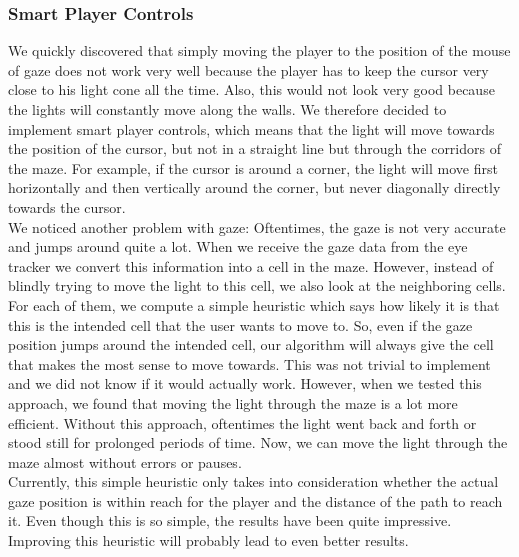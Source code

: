 \documentclass{sigchi}
\begin{document}
\subsubsection{Smart Player Controls} 
We quickly discovered that simply moving the player to the position of the mouse of gaze does not work very well because the player has to keep the cursor very close to his light cone all the time. Also, this would not look very good because the lights will constantly move along the walls. We therefore decided to implement smart player controls, which means that the light will move towards the position of the cursor, but not in a straight line but through the corridors of the maze. For example, if the cursor is around a corner, the light will move first horizontally and then vertically around the corner, but never diagonally directly towards the cursor. \\
We noticed another problem with gaze: Oftentimes, the gaze is not very accurate and jumps around quite a lot. When we receive the gaze data from the eye tracker we convert this information into a cell in the maze. However, instead of blindly trying to move the light to this cell, we also look at the neighboring cells. For each of them, we compute a simple heuristic which says how likely it is that this is the intended cell that the user wants to move to. So, even if the gaze position jumps around the intended cell, our algorithm will always give the cell that makes the most sense to move towards. This was not trivial to implement and we did not know if it would actually work. However, when we tested this approach, we found that moving the light through the maze is a lot more efficient. Without this approach, oftentimes the light went back and forth or stood still for prolonged periods of time. Now, we can move the light through the maze almost without errors or pauses.\\
Currently, this simple heuristic only takes into consideration whether the actual gaze position is within reach for the player and the distance of the path to reach it. Even though this is so simple, the results have been quite impressive. Improving this heuristic will probably lead to even better results.
\end{document}
